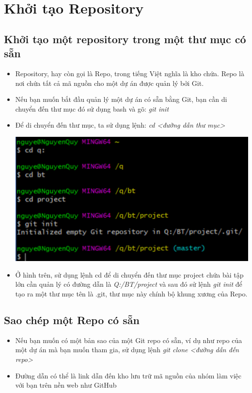 \documentclass[12pt,a4paper]{report}
\begin{document}
\section{Khởi tạo Repository}

\subsection{Khởi tạo một repository trong một thư mục có sẵn}
\begin{itemize}
\item Repository, hay còn gọi là Repo, trong tiếng Việt nghĩa là kho chứa. Repo là nơi chứa tất cả mã nguồn cho một dự án được quản lý bởi Git.
\item Nếu bạn muốn bắt đầu quản lý một dự án có sẵn bằng Git, bạn cần di chuyển đến thư mục đó sử dụng bash và gõ: \textit{git init}
\item Để di chuyển đến thư mục, ta sử dụng lệnh: {\it cd <đường dẫn thư mục> }

	\includegraphics[width=0.8\linewidth]{screenshot005}

	\label{fig:screenshot005}

\item Ở hình trên, sử dụng lệnh cd để di chuyển đến thư mục project chứa bài tập lớn cần quản lý có đường dẫn là {\it Q:/BT/project} và sau đó sử lệnh {\it git init} để tạo ra một thư mục tên là .git, thư mục này chính bộ khung xương của Repo.
\end{itemize}
\subsection{Sao chép một Repo có sẵn}
\begin{itemize}
\item Nếu bạn muốn có một bản sao của một Git repo có sẵn, ví dụ như repo của một dự án mà bạn muốn tham gia, sử dụng lệnh {\it git clone <đường dẫn đến repo>}
\item Đường dẫn có thể là link dẫn đến kho lưu trữ mã nguồn của nhóm làm việc với bạn trên nền web như GitHub
\end{itemize}
\end{document}
